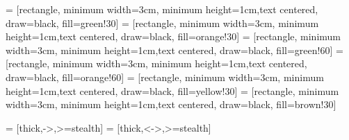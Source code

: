  = [rectangle, minimum width=3cm, minimum height=1cm,text centered, draw=black, fill=green!30]
 = [rectangle, minimum width=3cm, minimum height=1cm,text centered, draw=black, fill=orange!30]
 = [rectangle, minimum width=3cm, minimum height=1cm,text centered, draw=black, fill=green!60]
 = [rectangle, minimum width=3cm, minimum height=1cm,text centered, draw=black, fill=orange!60]
 = [rectangle, minimum width=3cm, minimum height=1cm,text centered, draw=black, fill=yellow!30]
 = [rectangle, minimum width=3cm, minimum height=1cm,text centered, draw=black, fill=brown!30]

 = [thick,->,>=stealth]
 = [thick,<->,>=stealth]


